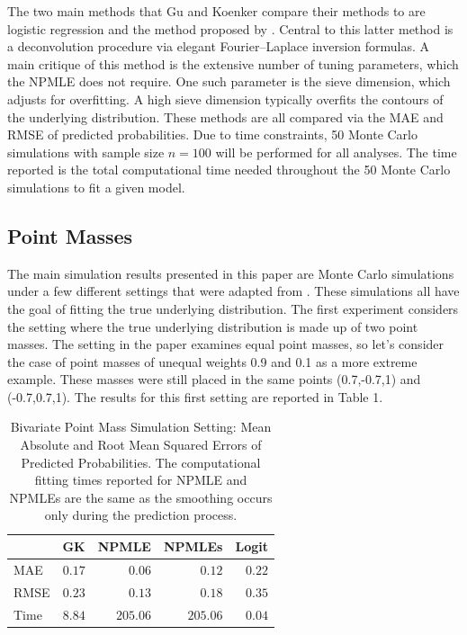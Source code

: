 \documentclass[11pt]{article}
\begin{document}
The two main methods that Gu and Koenker compare their methods to are logistic regression and the method proposed by \cite{gautier2013nonparametric}. Central to this latter method is a deconvolution procedure via elegant Fourier–Laplace inversion formulas. A main critique of this method is the extensive number of tuning parameters, which the NPMLE does not require. One such parameter is the sieve dimension, which adjusts for overfitting. A high sieve dimension typically overfits the contours of the underlying distribution. These methods are all compared via the MAE and RMSE of predicted probabilities. Due to time constraints, 50 Monte Carlo simulations  with sample size $n = 100$ will be performed for all analyses. The time reported is the total computational time needed throughout the 50 Monte Carlo simulations to fit a given model.

\subsection{Point Masses}

\indent

The main simulation results presented in this paper are Monte Carlo simulations under a few different settings that were adapted from \cite{gautier2013nonparametric}. These simulations all have the goal of fitting the true underlying distribution. The first experiment considers the setting where the true underlying distribution is made up of two point masses. The setting in the paper examines equal point masses, so let's consider the case of point masses of unequal weights 0.9 and 0.1 as a more extreme example. These masses were still placed in the same points (0.7,-0.7,1) and (-0.7,0.7,1). The results for this first setting are reported in Table 1.   

\begin{table}[!htbp]
\begin{center}
\begin{tabular}{lrrrr}
\hline\hline
\multicolumn{1}{l}{}&\multicolumn{1}{c}{GK}&\multicolumn{1}{c}{NPMLE}&\multicolumn{1}{c}{NPMLEs}&\multicolumn{1}{c}{Logit}\tabularnewline
\hline
MAE&$0.17$&$  0.06$&$  0.12$&$0.22$\tabularnewline
RMSE&$0.23$&$  0.13$&$  0.18$&$0.35$\tabularnewline
Time&$8.84$&$205.06$&$205.06$&$0.04$\tabularnewline
\hline
\end{tabular}
\caption{Bivariate Point Mass Simulation Setting:  
Mean Absolute and Root Mean Squared Errors of Predicted Probabilities. 
The computational fitting times reported for NPMLE and NPMLEs are the same as
the smoothing occurs only during the prediction process.}
\label{tab.sim0a}
\end{center}
\end{table}
\end{document}
